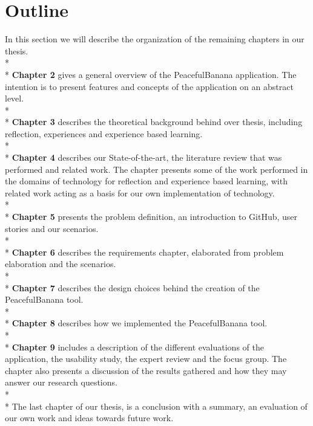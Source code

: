 \section{Outline}
In this section we will describe the organization of the remaining chapters in our thesis. 
\\*
\\*
\textbf{Chapter 2} gives a general overview of the PeacefulBanana application. The intention is to present features and concepts of the application on an abstract level.
\\*
\\*
\textbf{Chapter 3} describes the theoretical background behind over thesis, including reflection, experiences and experience based learning. 
\\*
\\*
\textbf{Chapter 4} describes our State-of-the-art, the literature review that was performed and related work. The chapter presents some of the work performed in the domains of technology for reflection and experience based learning, with related work acting as a basis for our own implementation of technology. 
\\*
\\*
\textbf{Chapter 5} presents the problem definition, an introduction to GitHub, user stories and our scenarios. 
\\*
\\*
\textbf{Chapter 6} describes the requirements chapter, elaborated from problem elaboration and the scenarios. 
\\*
\\*
\textbf{Chapter 7} describes the design choices behind the creation of the PeacefulBanana tool.
\\*
\\*
\textbf{Chapter 8} describes how we implemented the PeacefulBanana tool. 
\\*
\\*
\textbf{Chapter 9} includes a description of the different evaluations of the application, the usability study, the expert review and the focus group. The chapter also presents a discussion of the results gathered and how they may answer our research questions.
\\*
\\*
The last chapter of our thesis, is a conclusion with a summary, an evaluation of our own work and ideas towards future work.
